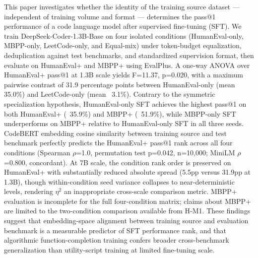 
This paper investigates whether the identity of the training source dataset --- independent of training volume and format --- determines the pass@1 performance of a code language model after supervised fine-tuning (SFT). We train DeepSeek-Coder-1.3B-Base on four isolated conditions (HumanEval-only, MBPP-only, LeetCode-only, and Equal-mix) under token-budget equalization, deduplication against test benchmarks, and standardized supervision format, then evaluate on HumanEval+ and MBPP+ using EvalPlus. A one-way ANOVA over HumanEval+ pass@1 at 1.3B scale yields F=11.37, p=0.020, with a maximum pairwise contrast of 31.9 percentage points between HumanEval-only (mean 35.0\%) and LeetCode-only (mean ~3.1\%). Contrary to the symmetric specialization hypothesis, HumanEval-only SFT achieves the highest pass@1 on both HumanEval+ (~35.9\%) and MBPP+ (~51.9\%), while MBPP-only SFT underperforms on MBPP+ relative to HumanEval-only SFT in all three seeds. CodeBERT embedding cosine similarity between training source and test benchmark perfectly predicts the HumanEval+ pass@1 rank across all four conditions (Spearman $\rho$=1.0, permutation test p=0.042, n=10,000; MiniLM $\rho$=0.800, concordant). At 7B scale, the condition rank order is preserved on HumanEval+ with substantially reduced absolute spread (5.5pp versus 31.9pp at 1.3B), though within-condition seed variance collapses to near-deterministic levels, rendering $\eta^2$ an inappropriate cross-scale comparison metric. MBPP+ evaluation is incomplete for the full four-condition matrix; claims about MBPP+ are limited to the two-condition comparison available from H-M1. These findings suggest that embedding-space alignment between training source and evaluation benchmark is a measurable predictor of SFT performance rank, and that algorithmic function-completion training confers broader cross-benchmark generalization than utility-script training at limited fine-tuning scale.

